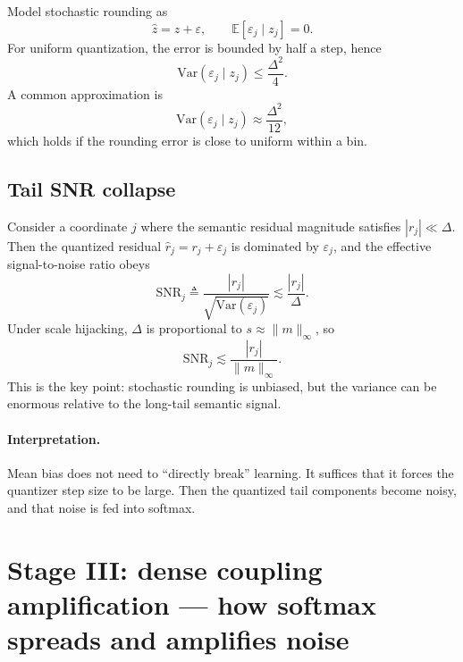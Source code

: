 Model stochastic rounding as
\begin{equation}
\hat z = z + \varepsilon,
\qquad
\mathbb{E}[\varepsilon_j\mid z_j]=0.
\label{eq:sr_noise_model}
\end{equation}
For uniform quantization, the error is bounded by half a step, hence
\begin{equation}
\mathrm{Var}(\varepsilon_j\mid z_j)\le \frac{\Delta^2}{4}.
\label{eq:sr_var_bound}
\end{equation}
A common approximation is
\begin{equation}
\mathrm{Var}(\varepsilon_j\mid z_j)\approx \frac{\Delta^2}{12},
\label{eq:sr_var_approx}
\end{equation}
which holds if the rounding error is close to uniform within a bin.

\subsection{Tail SNR collapse}

Consider a coordinate $j$ where the semantic residual magnitude satisfies $|r_j|\ll \Delta$.
Then the quantized residual $\hat r_j=r_j+\varepsilon_j$ is dominated by $\varepsilon_j$,
and the effective signal-to-noise ratio obeys
\begin{equation}
\mathrm{SNR}_j
\triangleq
\frac{|r_j|}{\sqrt{\mathrm{Var}(\varepsilon_j)}}
\lesssim
\frac{|r_j|}{\Delta}.
\label{eq:snr_tail}
\end{equation}
Under scale hijacking, $\Delta$ is proportional to $s\approx \|m\|_\infty$, so
\begin{equation}
\mathrm{SNR}_j \lesssim \frac{|r_j|}{\|m\|_\infty}.
\label{eq:snr_mean_control}
\end{equation}
This is the key point: stochastic rounding is unbiased, but the variance can be
enormous relative to the long-tail semantic signal.

\paragraph{Interpretation.}
Mean bias does not need to ``directly break'' learning. It suffices that it forces
the quantizer step size to be large. Then the quantized tail components become noisy,
and that noise is fed into softmax.

\section{Stage III: dense coupling amplification --- how softmax spreads and amplifies noise}

